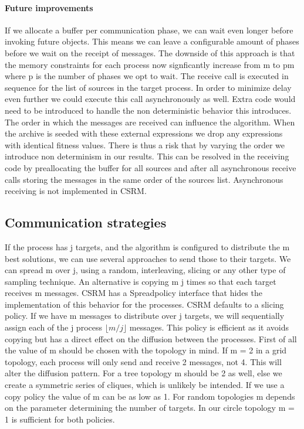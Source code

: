 \paragraph{Future improvements}
If we allocate a buffer per communication phase, we can wait even longer before invoking future objects. This means we can leave a configurable amount of phases before we wait on the receipt of messages. The downside of this approach is that the memory constraints for each process now signficantly increase from m to pm where p is the number of phases we opt to wait.
The receive call is executed in sequence for the list of sources in the target process. In order to minimize delay even further we could execute this call asynchronously as well. Extra code would need to be introduced to handle the non deterministic behavior this introduces. The order in which the messages are received can influence the algorithm. When the archive is seeded with these external expressions we drop any expressions with identical fitness values. There is thus a risk that by varying the order we introduce non determinism in our results. This can be resolved in the receiving code by preallocating the buffer for all sources and after all asynchronous receive calls storing the messages in the same order of the sources list. 
Asynchronous receiving is not implemented in CSRM.

\subsection{Communication strategies}
If the process has j targets, and the algorithm is configured to distribute the m best solutions, we can use several approaches to send those to their targets. We can spread m over j, using a random, interleaving, slicing or any other type of sampling technique. An alternative is copying m j times so that each target receives m messages.
CSRM has a Spreadpolicy interface that hides the implementation of this behavior for the processes. CSRM defaults to a slicing policy. If we have m messages to distribute over j targets, we will sequentially assign each of the j process $ \lfloor{m/j}\rfloor $ messages.
This policy is efficient as it avoids copying but has a direct effect on the diffusion between the processes. First of all the value of m should be chosen with the topology in mind. If m = 2 in a grid topology, each process will only send and receive 2 messages, not 4. This will alter the diffusion pattern. For a tree topology m should be 2 as well, else we create a symmetric series of cliques, which is unlikely be intended. If we use a copy policy the value of m can be as low as 1. For random topologies m depends on the parameter determining the number of targets. In our circle topology m = 1 is sufficient for both policies.

